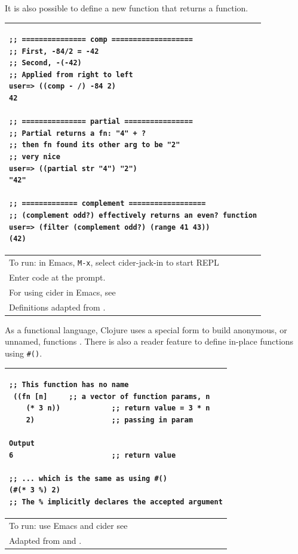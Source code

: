 \documentclass[12pt]{article}
\begin{document}
It is also possible to define a new function that returns a function.

\begin{tabular}{|p{}|}
\hline
\begin{verbatim}
;; =============== comp ===================
;; First, -84/2 = -42
;; Second, -(-42)
;; Applied from right to left
user=> ((comp - /) -84 2)
42

;; =============== partial ================
;; Partial returns a fn: "4" + ?
;; then fn found its other arg to be "2"
;; very nice
user=> ((partial str "4") "2")
"42"

;; ============= complement ==================
;; (complement odd?) effectively returns an even? function
user=> (filter (complement odd?) (range 41 43))
(42)
\end{verbatim}
\\
\hline
To run: in Emacs, \texttt{M-x}, select cider-jack-in to start REPL\\
Enter code at the prompt.\\
For using cider in Emacs, see \cite{brave2015}\\
\hline
Definitions adapted from \cite{empty}.\\
\hline
\end{tabular}




As a functional language, Clojure uses a special form to build anonymous, or unnamed, functions \cite{fogus2014joy}. There is also a reader feature to define in-place functions using \texttt{\#()}.

\begin{tabular}{|p{}|}
\hline
\begin{verbatim}
;; This function has no name
 ((fn [n]     ;; a vector of function params, n
    (* 3 n))            ;; return value = 3 * n
    2)                  ;; passing in param
    
Output
6                       ;; return value

;; ... which is the same as using #()
(#(* 3 %) 2)  
;; The % implicitly declares the accepted argument
\end{verbatim}
\\
\hline
To run: use Emacs and cider see \cite{brave2015}\\
\hline
Adapted from \cite{koan} and \cite{fogus2014joy}.\\
\hline
\end{tabular}
\end{document}
